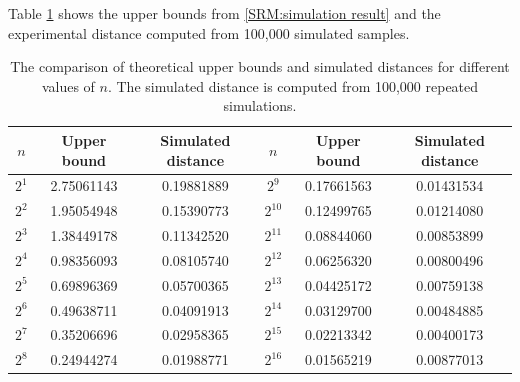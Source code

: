 \documentclass[pdflatex,sn-mathphys-ay]{sn-jnl}
\newcommand{\beas}{\begin{eqnarray*}}
\newcommand{\enas}{\end{eqnarray*}}
\theoremstyle{thmstyleone}%
\theoremstyle{thmstyletwo}%
\theoremstyle{thmstylethree}%
\begin{document}

Table \ref{tab:samp} shows the upper bounds from \eqref{SRM:simulation result} and the experimental distance computed from 100,000 simulated samples.  

\begin{table}[!htbp]
		\centering
	\begin{tabular}{|c|c|c|c|c|c|}
		\hline
		$n$ & Upper bound  & Simulated distance
		& $n$ & Upper bound & Simulated distance   \\
		\hline
		$2^1$   & 2.75061143 & 0.19881889 & $2^{9}$  & 0.17661563 & 0.01431534 \\
		$2^2$   & 1.95054948 & 0.15390773 & $2^{10}$ & 0.12499765 & 0.01214080 \\
		$2^3$   & 1.38449178 & 0.11342520 & $2^{11}$ & 0.08844060 & 0.00853899 \\
		$2^4$   & 0.98356093 & 0.08105740 & $2^{12}$ & 0.06256320 & 0.00800496 \\
		$2^5$   & 0.69896369 & 0.05700365 & $2^{13}$ & 0.04425172 & 0.00759138 \\
		$2^6$   & 0.49638711 & 0.04091913 & $2^{14}$ & 0.03129700 & 0.00484885 \\
		$2^7$   & 0.35206696 & 0.02958365 & $2^{15}$ & 0.02213342 & 0.00400173 \\
		$2^8$   & 0.24944274 & 0.01988771 & $2^{16}$ & 0.01565219 & 0.00877013 \\
		\hline
	\end{tabular}
	\caption{The comparison of theoretical upper bounds and simulated distances for different values of $n$. The simulated distance is computed from 100,000 repeated simulations.}
    \label{tab:samp}
\end{table}
\end{document}
